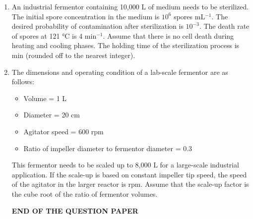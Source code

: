 \documentclass[12pt]{article}
\begin{document}
\begin{enumerate}[label=Q.\arabic*,start=26]
	\item An industrial fermentor containing 10,000 L of medium needs to be sterilized. The initial spore concentration in the medium is $10^6$ spores mL$^{-1}$. The desired probability of contamination after sterilization is $10^{-3}$. The death rate of spores at 121 °C is 4 min$^{-1}$. Assume that there is no cell death during heating and cooling phases. The holding time of the sterilization process is \underline{\hspace{2cm}} min (rounded off to the nearest integer).

	\item The dimensions and operating condition of a lab-scale fermentor are as follows:
		\begin{itemize}
			\item Volume = 1 L
			\item Diameter = 20 cm
			\item Agitator speed = 600 rpm
			\item Ratio of impeller diameter to fermentor diameter = 0.3
		\end{itemize}

		This fermentor needs to be scaled up to 8,000 L for a large-scale industrial application. If the scale-up is based on constant impeller tip speed, the speed of the agitator in the larger reactor is \underline{\hspace{2cm}} rpm. Assume that the scale-up factor is the cube root of the ratio of fermentor volumes.
		\begin{center}{
				\textbf{END OF THE QUESTION PAPER
				}
		}\end{center}
\end{enumerate}
\end{document}
